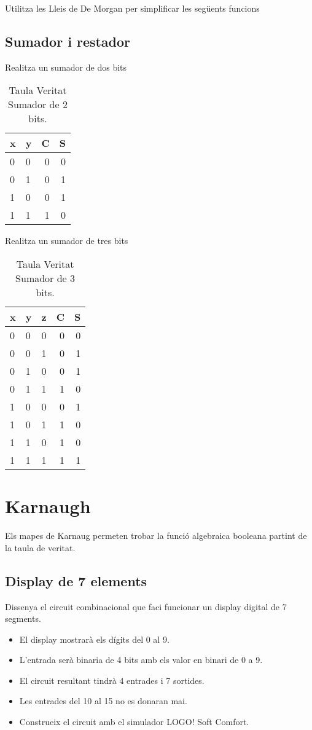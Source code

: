 \documentclass[a4paper]{article}
\begin{document}
Utilitza les Lleis de De Morgan per simplificar les següents funcions

\subsection{Sumador i restador}

Realitza un sumador de dos bits

\begin{table}[!htbp]
\centering
\begin{tabular}{ll|rr}
x&y&C&S \\\hline
0&0&0&0 \\
0&1&0&1 \\
1&0&0&1 \\
1&1&1&0 \\

\end{tabular}
\caption{\label{tab:widgets}Taula Veritat Sumador de 2 bits.}
\end{table}

Realitza un sumador de tres bits

\begin{table}[!htbp]
\centering
\begin{tabular}{lll|rr}
x&y&z&C&S \\\hline
0&0&0&0&0 \\
0&0&1&0&1 \\
0&1&0&0&1 \\
0&1&1&1&0 \\
1&0&0&0&1 \\
1&0&1&1&0 \\
1&1&0&1&0 \\
1&1&1&1&1 \\

\end{tabular}
\caption{\label{tab:widgets}Taula Veritat Sumador de 3 bits.}
\end{table}

\section{Karnaugh}
\label{sec:introduction}

Els mapes de Karnaug permeten trobar la funci\'o algebraica booleana partint de la taula de veritat.

\subsection{Display de 7 elements}
Dissenya el circuit combinacional que faci funcionar un display digital de 7 segments.
\begin{itemize}
\item El display mostrar\`a els d\'igits del 0 al 9.
\item L'entrada ser\`a binaria de 4 bits amb els valor en binari de 0 a 9.
\item El circuit resultant tindr\`a 4 entrades i 7 sortides.
\item Les entrades del 10 al 15 no es donaran mai. 
\item Construeix el circuit amb el simulador LOGO! Soft Comfort.
\end{itemize}
\end{document}
